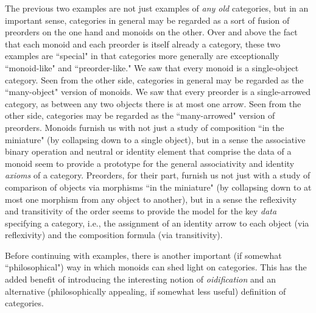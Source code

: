 \documentclass[a4paper]{book}
\theoremstyle{definition}
\theoremstyle{definition}
\theoremstyle{definition}
\theoremstyle{theorem}
\theoremstyle{definition}
\begin{document}
	The previous two examples are not just examples of \textit{any old} categories, but in an important sense, categories in general may be regarded as a sort of fusion of preorders on the one hand and monoids on the other. Over and above the fact that each monoid and each preorder is itself already a category, these two examples are ``special" in that categories more generally are exceptionally ``monoid-like" and ``preorder-like." We saw that every monoid is a single-object category. Seen from the other side, categories in general may be regarded as the ``many-object" version of monoids. We saw that every preorder is a single-arrowed category, as between any two objects there is at most one arrow. Seen from the other side, categories may be regarded as the ``many-arrowed" version of preorders. Monoids furnish us with not just a study of composition ``in the miniature" (by collapsing down to a single object), but in a sense the associative binary operation and neutral or identity element that comprise the data of a monoid seem to provide a prototype for the general associativity and identity \textit{axioms} of a category. Preorders, for their part, furnish us not just with a study of comparison of objects via morphisms ``in the miniature" (by collapsing down to at most one morphism from any object to another), but in a sense the reflexivity and transitivity of the order seems to provide the model for the key \textit{data} specifying a category, i.e., the assignment of an identity arrow to each object (via reflexivity) and the composition formula (via transitivity).\par 
Before continuing with examples, there is another important (if somewhat ``philosophical") way in which monoids can shed light on categories. This has the added benefit of introducing the interesting notion of \textit{oidification} and an alternative (philosophically appealing, if somewhat less useful) definition of categories.
\end{document}
